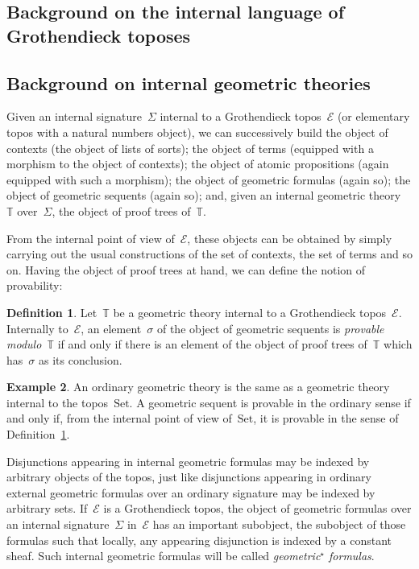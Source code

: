 \documentclass[oneside,reqno]{amsart}
\theoremstyle{definition}
\newtheorem{defn}{Definition}[section]
\newtheorem{ex}[defn]{Example}
\theoremstyle{plain}
\theoremstyle{remark}
\newcommand{\E}{\mathcal{E}}
\newcommand{\TT}{\mathbb{T}}
\newcommand{\Set}{\mathrm{Set}}
\renewcommand{\_}{\mathpunct{.}\,}
\newcommand{\?}{\,{:}\,}
\begin{document}
\subsection{Background on the internal language of Grothendieck toposes}
\label{sect:review-language}



\subsection{Background on internal geometric theories}
\label{sect:review-theories}


Given an internal signature~$\Sigma$ internal to a Grothendieck topos~$\E$ (or
elementary topos with a natural numbers object), we can successively build the
object of contexts (the object of lists of sorts); the object of terms
(equipped with a morphism to the object of contexts); the object of atomic
propositions (again equipped with such a morphism); the object of geometric
formulas (again so); the object of geometric sequents (again so); and, given an
internal geometric theory~$\TT$ over~$\Sigma$, the object of proof trees of~$\TT$.

From the internal point of view of~$\E$, these objects can be obtained by
simply carrying out the usual constructions of the set of contexts, the set of
terms and so on. Having the object of proof trees at hand, we can define
the notion of provability:

\begin{defn}\label{defn:provability}
Let~$\TT$ be a geometric theory internal to a Grothendieck topos~$\E$.
Internally to~$\E$, an element~$\sigma$ of the object of geometric sequents is
\emph{provable modulo~$\TT$} if and only if there is an element of the object
of proof trees of~$\TT$ which has~$\sigma$ as its conclusion.\end{defn}

\begin{ex}An ordinary geometric theory is the same as a geometric theory
internal to the topos~$\Set$. A geometric sequent is provable in the ordinary
sense if and only if, from the internal point of view of~$\Set$, it is provable
in the sense of Definition~\ref{defn:provability}.\end{ex}

Disjunctions appearing in internal geometric formulas may be indexed by
arbitrary objects of the topos, just like disjunctions appearing in ordinary
external geometric formulas over an ordinary signature may be indexed by
arbitrary sets. If~$\E$ is a Grothendieck topos, the object of geometric
formulas over an internal signature~$\Sigma$ in~$\E$ has an important
subobject, the subobject of those formulas such that locally, any appearing
disjunction is indexed by a constant sheaf. Such internal geometric formulas
will be called \emph{geometric$^\star$ formulas}.
\end{document}
